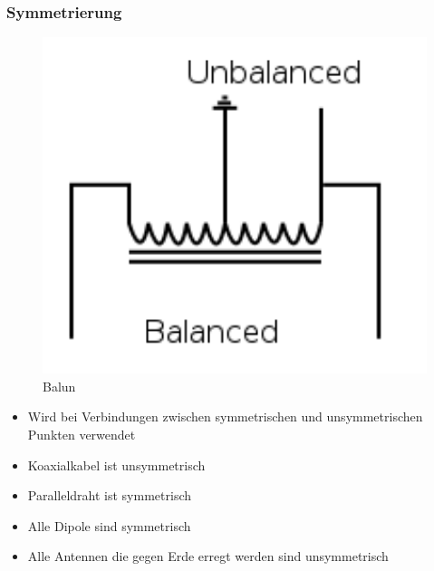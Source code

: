 \begin{frame}
\frametitle{Symmetrierung}
\begin{minipage}{0.3\textwidth}
  \begin{figure}
	\includegraphics[width=1\textwidth,height=.8\textheight,keepaspectratio]{e10/balun.png}
	\caption{Balun\cite{balun}}
      \end{figure}

\end{minipage}
\begin{minipage}{0.6\textwidth}
	\begin{itemize}
		\item Wird bei Verbindungen zwischen symmetrischen und unsymmetrischen Punkten verwendet
		\item Koaxialkabel ist unsymmetrisch
		\item Paralleldraht ist symmetrisch
		\item Alle Dipole sind symmetrisch
		\item Alle Antennen die gegen Erde erregt werden sind unsymmetrisch
	\end{itemize}
\end{minipage}
\end{frame}

